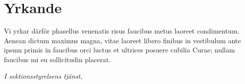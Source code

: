\documentclass[proposition]{fclass}
\begin{document}



\section*{Yrkande}
Vi yrkar därför
\batt
phasellus venenatis risus faucibus metus laoreet condimentum. Aenean dictum maximus magna, vitae laoreet libero finibus in
\eatt
\batt
vestibulum ante ipsum primis in faucibus orci luctus et ultrices posuere cubilia Curae; nullam faucibus mi eu sollicitudin placerat. 
\eatt




\begin{signblock}
\vspace{15mm}
\emph{I sektionsstyrelsens tjänst, } %
\end{signblock}

\end{document}
